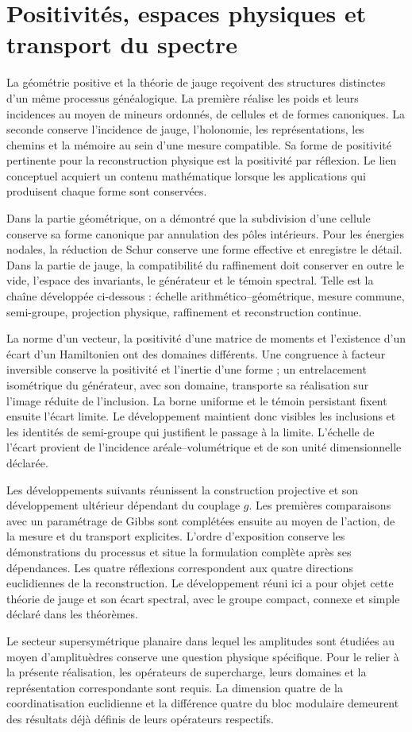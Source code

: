 \section{Positivités, espaces physiques et transport du spectre}
La géométrie positive et la théorie de jauge reçoivent des structures distinctes d'un même processus généalogique. La première réalise les poids et leurs incidences au moyen de mineurs ordonnés, de cellules et de formes canoniques. La seconde conserve l'incidence de jauge, l'holonomie, les représentations, les chemins et la mémoire au sein d'une mesure compatible. Sa forme de positivité pertinente pour la reconstruction physique est la positivité par réflexion. Le lien conceptuel acquiert un contenu mathématique lorsque les applications qui produisent chaque forme sont conservées.

Dans la partie géométrique, on a démontré que la subdivision d’une cellule
conserve sa forme canonique par annulation des pôles intérieurs.
Pour les énergies nodales, la réduction de Schur conserve une forme
effective et enregistre le détail. Dans la partie de jauge, la compatibilité du
raffinement doit conserver en outre le vide, l’espace des invariants,
le générateur et le témoin spectral. Telle est la chaîne développée
ci-dessous : échelle arithmético--géométrique, mesure commune, semi-groupe,
projection physique, raffinement et reconstruction continue.

La norme d’un vecteur, la positivité d’une matrice de moments et
l’existence d’un écart d’un Hamiltonien ont des domaines différents.
Une congruence à facteur inversible conserve la positivité et
l’inertie d’une forme ; un entrelacement isométrique du générateur, avec son
domaine, transporte sa réalisation sur l’image réduite de
l’inclusion. La borne uniforme et le témoin persistant fixent ensuite
l’écart limite. Le développement maintient donc visibles les
inclusions et les identités de semi-groupe qui justifient le passage à la
limite. L’échelle de l’écart provient de l’incidence aréale--volumétrique
et de son unité dimensionnelle déclarée.

Les développements suivants réunissent la construction projective et son développement ultérieur dépendant du couplage \(g\). Les premières comparaisons avec un paramétrage de Gibbs sont complétées ensuite au moyen de l'action, de la mesure et du transport explicites. L'ordre d'exposition conserve les démonstrations du processus et situe la formulation complète après ses dépendances. Les quatre réflexions correspondent aux quatre directions euclidiennes de la reconstruction. Le développement réuni ici a pour objet cette théorie de jauge et son écart spectral, avec le groupe compact, connexe et simple déclaré dans les théorèmes.

Le secteur supersymétrique planaire dans lequel les amplitudes sont étudiées au moyen d'amplituèdres conserve une question physique spécifique. Pour le relier à la présente réalisation, les opérateurs de supercharge, leurs domaines et la représentation correspondante sont requis. La dimension quatre de la coordinatisation euclidienne et la différence quatre du bloc modulaire demeurent des résultats déjà définis de leurs opérateurs respectifs.
